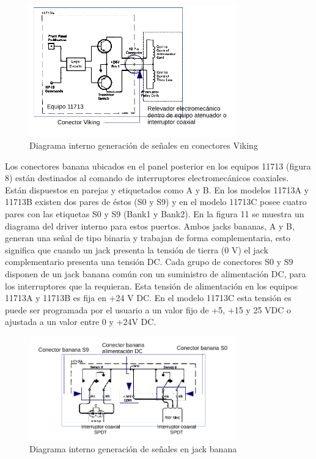 \begin{figure}[h!]
	\centering
	\includegraphics[width=0.8\textwidth]{Imagenes/DiagramaInternoConectorViking.pdf}
	\caption{Diagrama interno generación de señales en conectores Viking}
	\label{Fig:DiagramaInternoConectorViking}
\end{figure}

Los conectores banana ubicados en el panel posterior en los equipos 11713 (figura 8) están destinados al comando de interruptores electromecánicos coaxiales. Están dispuestos en parejas y etiquetados como A y B. En los  modelos 11713A y 11713B existen dos pares de éstos (S0 y S9) y en el modelo 11713C posee cuatro pares con las etiquetas S0 y S9 (Bank1 y Bank2). En la figura 11 se muestra un diagrama del driver interno para estos puertos. Ambos jacks bananas, A y B, generan una señal de tipo binaria y trabajan de forma complementaria, esto significa que cuando un jack presenta la tensión de tierra (0 V) el jack complementario presenta una tensión DC. Cada grupo de conectores S0 y S9 disponen de un jack banana común con un suministro de alimentación DC, para los interruptores que la requieran. Esta tensión de alimentación en los equipos 11713A y 11713B es fija en +24 V DC. En el modelo 11713C esta tensión es puede ser programada por el usuario a un valor fijo de +5, +15 y 25 VDC o ajustada a un valor entre 0 y +24V DC.

\begin{figure}[h!]
	\centering
	\includegraphics[width=0.8\textwidth]{Imagenes/DiagramaInternoJackBanana.pdf}
	\caption{Diagrama interno generación de señales en jack banana}
	\label{Fig:DiagramaInternoJackBanana}
\end{figure}


